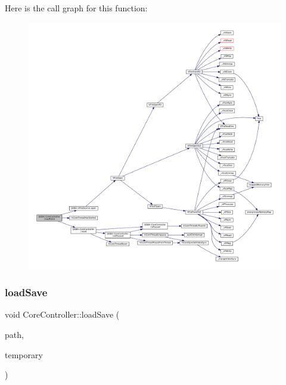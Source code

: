 Here is the call graph for this function\+:
\nopagebreak
\begin{figure}[H]
\begin{center}
\leavevmode
\includegraphics[width=350pt]{class_q_g_b_a_1_1_core_controller_a2b403c6740acab8b9e752375e35110cb_cgraph}
\end{center}
\end{figure}
\mbox{\label{class_q_g_b_a_1_1_core_controller_a798a269094b1066d112bd530cd2b87f1}} 
\subsubsection{\texorpdfstring{load\+Save}{loadSave}}
{\footnotesize\ttfamily void Core\+Controller\+::load\+Save (\begin{DoxyParamCaption}\item[{const Q\+String \&}]{path,  }\item[{\mbox{\hyperlink{libretro_8h_a4a26dcae73fb7e1528214a068aca317e}{bool}}}]{temporary }\end{DoxyParamCaption})\hspace{0.3cm}{\ttfamily [slot]}}

